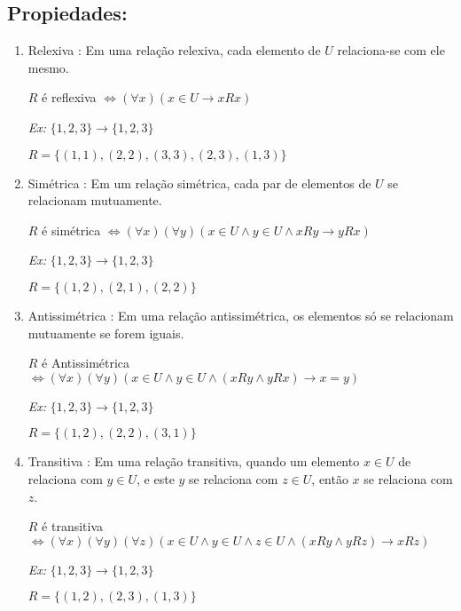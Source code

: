 \subsection{Propiedades:}
     \begin{enumerate}
        \item Relexiva : Em uma relação relexiva, cada elemento de $U$ relaciona-se com ele mesmo.
        
        $R$ é reflexiva $\Leftrightarrow (\forall x)(x  \in  U \rightarrow xRx)$ 
        
        \textit{Ex:} $\{1,2,3\} \rightarrow  \{1,2,3\}$
        
        $R = \{(1,1),(2,2),(3,3),(2,3),(1,3)\}$
        
        \item Simétrica : Em um relação simétrica, cada par de elementos de $U$ se relacionam mutuamente.
        
        $R$ é simétrica $\Leftrightarrow (\forall x)( \forall  y)(x \in U \wedge y \in U \wedge xRy  \rightarrow  yRx)$
        
        \textit{Ex:} $\{1,2,3\} \rightarrow  \{1,2,3\}$
        
        $R = \{(1,2),(2,1),(2,2)\}$
        
        
        \item Antissimétrica : Em uma relação antissimétrica, os elementos só se relacionam mutuamente se forem iguais.
        
        $R$ é Antissimétrica $\Leftrightarrow (\forall x)( \forall  y)(x \in U \wedge y \in U \wedge (xRy  \wedge yRx) \rightarrow x=y)$
        
        \textit{Ex:} $\{1,2,3\} \rightarrow  \{1,2,3\}$
        
        $R = \{(1,2),(2,2),(3,1)\}$
        
        \item Transitiva : Em uma relação transitiva, quando um elemento $x\in U$ de relaciona com  $y\in U$, e este $y$ se relaciona com $z \in U$, então $x$ se relaciona com $z$.
        
        $R$ é transitiva $\Leftrightarrow ( \forall x)( \forall  y)( \forall z)(x \in U \wedge y \in U \wedge z \in U \wedge   (xRy  \wedge yRz) \rightarrow xRz)$
        
        \textit{Ex:} $\{1,2,3\} \rightarrow  \{1,2,3\}$
        
        $R = \{(1,2),(2,3),(1,3)\}$
        
        
     \end{enumerate}

